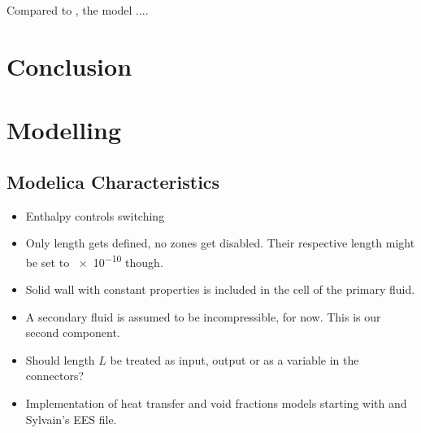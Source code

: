 \documentclass[11pt]{article} %
\begin{document}
Compared to \cite{Kaern2011b}, the model .... 


\cite{Zhang2006}

\cite{Zhang2009}

\section{Conclusion}




%
%

\printglossary[type=main]
\printglossary[type=acronym]
\printglossary[type=dimlessnumber]
\printglossary[type=greeksymbols]
\printglossary[type=subscripts]


\section{Modelling}

\subsection{Modelica Characteristics}

\begin{itemize}
\item Enthalpy controls switching
\item Only length gets defined, no zones get disabled. Their respective length might be set to \num{e-10} though. 
\item Solid wall with constant properties is included in the cell of the primary fluid. 
\item A secondary fluid is assumed to be incompressible, for now. This is our second component. 
\item Should length $L$ be treated as input, output or as a variable in the connectors?
\item Implementation of heat transfer and void fractions models starting with \cite{Kaern2011b} and Sylvain's EES file.
\end{itemize}
\end{document}
